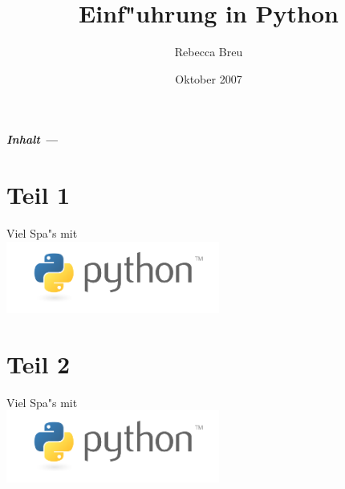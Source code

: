 \documentclass{beamer}
\title{Einf"uhrung in Python}
\date{Oktober 2007}
\author{Rebecca Breu}
\institute
{
 Verteilte Systeme und Grid-Computing \\
 JSC\\
 Forschungszentrum J"ulich
}
\begin{document}

\AtBeginPart
{
  \begin{frame}
  \titlepage
  \end{frame}

  \begin{frame}
  \frametitle{Inhalt --- \insertpart}
  \tableofcontents
  \end{frame}
}


\AtBeginSection[]
{
   \begin{frame}
       \frametitle{\insertsection}
       \tableofcontents[currentsection]
   \end{frame}
}

\part{Teil 1}








\begin{frame}
\begin{center}
\huge{Viel Spa"s mit}\\[4mm]
\includegraphics[width=7cm]{images/python-logo-master-v3-TM.png}
\end{center}
\end{frame}


\part{Teil 2}





\begin{frame}
\begin{center}
\huge{Viel Spa"s mit}\\[4mm]
\includegraphics[width=7cm]{images/python-logo-master-v3-TM.png}
\end{center}
\end{frame}

\appendix

\end{document}
